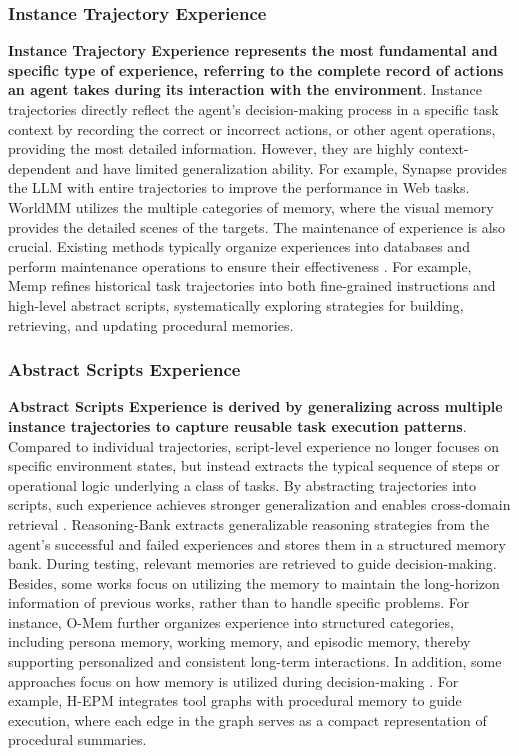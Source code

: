 \documentclass{llmxive}
\begin{document}
\subsubsection{Instance Trajectory Experience}
\label{sec:instance_trajectory_experience}
\textbf{Instance Trajectory Experience represents the most fundamental and specific type of experience, referring to the complete record of actions an agent takes during its interaction with the environment}. Instance trajectories directly reflect the agent's decision-making process in a specific task context by recording the correct or incorrect actions, or other agent operations, providing the most detailed information. However, they are highly context-dependent and have limited generalization ability. 
For example, Synapse \cite{Synapse} provides the LLM with entire trajectories to improve the performance in Web tasks. WorldMM \cite{WorldMM} utilizes the multiple categories of memory, where the visual memory provides the detailed scenes of the targets. The maintenance of experience is also crucial. Existing methods typically organize experiences into databases and perform maintenance operations to ensure their effectiveness \cite{Memp, CoPS}. For example, Memp \cite{Memp} refines historical task trajectories into both fine-grained instructions and high-level abstract scripts, systematically exploring strategies for building, retrieving, and updating procedural memories. 



\subsubsection{Abstract Scripts Experience}
\label{sec:abstract_scripts_experience}
\textbf{Abstract Scripts Experience is derived by generalizing across multiple instance trajectories to capture reusable task execution patterns}. Compared to individual trajectories, script-level experience no longer focuses on specific environment states, but instead extracts the typical sequence of steps or operational logic underlying a class of tasks. By abstracting trajectories into scripts, such experience achieves stronger generalization and enables cross-domain retrieval \cite{AGENTKB_2, BIFROST, AWM}. Reasoning-Bank \cite{Reasoning-Bank} extracts generalizable reasoning strategies from the agent’s successful and failed experiences and stores them in a structured memory bank. During testing, relevant memories are retrieved to guide decision-making. Besides, some works \cite{MemGPT, O-Mem} focus on utilizing the memory to maintain the long-horizon information of previous works, rather than to handle specific problems. For instance, O-Mem \cite{O-Mem} further organizes experience into structured categories, including persona memory, working memory, and episodic memory, thereby supporting personalized and consistent long-term interactions. 
In addition, some approaches focus on how memory is utilized during decision-making \cite{Voyager, H-EPM}. For example, H-EPM \cite{H-EPM} integrates tool graphs with procedural memory to guide execution, where each edge in the graph serves as a compact representation of procedural summaries. 
\end{document}
